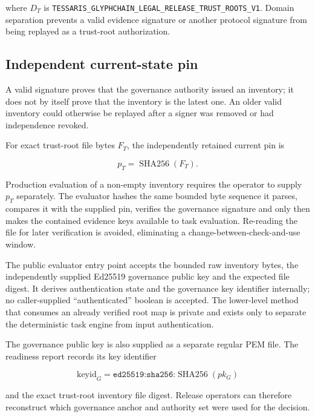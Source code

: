where $D_T$ is
\texttt{TESSARIS\_GLYPHCHAIN\_LEGAL\_RELEASE\_TRUST\_ROOTS\_V1}.  Domain
separation prevents a valid evidence signature or another protocol signature from
being replayed as a trust-root authorization.

\subsection{Independent current-state pin}

A valid signature proves that the governance authority issued an inventory; it does
not by itself prove that the inventory is the latest one.  An older valid inventory
could otherwise be replayed after a signer was removed or had independence revoked.

For exact trust-root file bytes $F_T$, the independently retained current pin is

\begin{equation}
  p_T = \operatorname{SHA256}(F_T).
\end{equation}

Production evaluation of a non-empty inventory requires the operator to supply
$p_T$ separately.  The evaluator hashes the same bounded byte sequence it parses,
compares it with the supplied pin, verifies the governance signature and only then
makes the contained evidence keys available to task evaluation.  Re-reading the
file for later verification is avoided, eliminating a change-between-check-and-use
window.

The public evaluator entry point accepts the bounded raw inventory bytes, the
independently supplied Ed25519 governance public key and the expected file digest.
It derives authentication state and the governance key identifier internally; no
caller-supplied ``authenticated'' boolean is accepted.  The lower-level method
that consumes an already verified root map is private and exists only to separate
the deterministic task engine from input authentication.

The governance public key is also supplied as a separate regular PEM file.  The
readiness report records its key identifier

\begin{equation}
  \mathrm{keyid}_G =
  \texttt{ed25519:sha256:}\operatorname{SHA256}(pk_G)
\end{equation}

and the exact trust-root inventory file digest.  Release operators can therefore
reconstruct which governance anchor and authority set were used for the decision.

